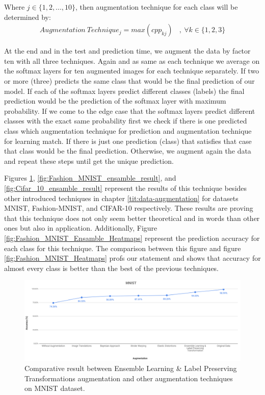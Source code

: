 Where $j \in \{1,2,...,10\}$, then augmentation technique for each class will be determined by:
\begin{equation}
  \begin{aligned}
    Augmentation \ Technique_{j} = max(cpp_{kj}) \ \ \ \ , \ \forall k \in \{1,2,3\}
  \end{aligned}
\end{equation}

At the end and in the test and prediction time, we augment the data by factor ten with all three
techniques. Again and as same as each technique we average on the softmax layers for ten augmented
images for each technique separately. If two or more (three) predicts the same class that would be the
final prediction of our model. If each of the softmax layers predict different classes (labels) the
final prediction would be the prediction of the softmax layer with maximum probability.  If we come
to the edge case that the softmax layers predict different classes with the exact same probability
first we check if there is one predicted class which augmentation technique for prediction and
augmentation technique for learning match. If there is just one prediction (class) that satisfies
that case that class would be the final prediction. Otherwise, we augment again the data and repeat
these steps until get the unique prediction.

Figures \ref{fig:MNIST_ensamble_result}, \ref{fig:Fashion_MNIST_ensamble_result}, and \ref{fig:Cifar_10_ensamble_result} represent the results of this technique besides other introduced techniques in
chapter \ref{tit:data-augmentation} for datasets MNIST, Fashion-MNIST, and CIFAR-10 respectively. These results are
proving that this technique does not only seem better theoretical and in words than other ones but
also in application. Additionally, Figure \ref{fig:Fashion_MNIST_Ensamble_Heatmaps} represent the
prediction accuracy for each class for this technique. The comparison between this figure and figure
\ref{fig:Fashion_MNIST_Heatmaps} profs our statement and shows that accuracy for almost every class is better than the best of the previous techniques.

\begin{figure}
  \centering
  \label{fig:MNIST_ensamble_result}
  \includegraphics[width=1\textwidth]{fig/contribution/mnist-ensamble-result}
  \caption{Comparative result between Ensemble Learning \& Label Preserving Transformations augmentation and other augmentation techniques on MNIST dataset.}
\end{figure}


